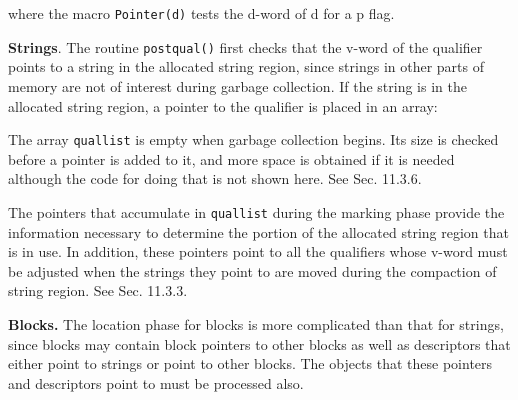 \goodbreak
{}


\noindent
where the macro \texttt{Pointer(d)} tests the d-word of d for a p flag.

\textbf{Strings}. The routine \texttt{postqual()} first checks that
the v-word of the qualifier points to a string in the allocated string
region, since strings in other parts of memory are not of interest
during garbage collection. If the string is in the allocated string
region, a pointer to the qualifier is placed in an array:

\goodbreak
{}



The array \texttt{quallist} is empty when garbage collection
begins. Its size is checked before a pointer is added to it, and more
space is obtained if it is needed although the code for doing that is
not shown here. See Sec. 11.3.6.

The pointers that accumulate in \texttt{quallist} during the marking
phase provide the information necessary to determine the portion of
the allocated string region that is in use. In addition, these
pointers point to all the qualifiers whose v-word must be adjusted
when the strings they point to are moved during the compaction of
string region. See Sec. 11.3.3.

\textbf{Blocks. }The location phase for blocks is more complicated
than that for strings, since blocks may contain block pointers to
other blocks as well as descriptors that either point to strings or
point to other blocks.  The objects that these pointers and
descriptors point to must be processed also.

